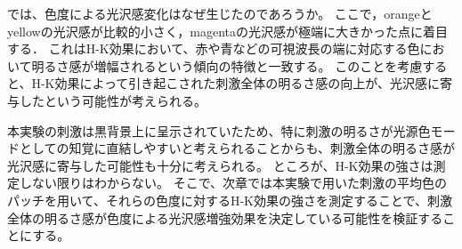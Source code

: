         では、色度による光沢感変化はなぜ生じたのであろうか。
        ここで，orangeとyellowの光沢感が比較的小さく，magentaの光沢感が極端に大きかった点に着目する．
        これはH-K効果において、赤や青などの可視波長の端に対応する色において明るさ感が増幅されるという傾向\cite{HKeffect}の特徴と一致する。
        このことを考慮すると、H-K効果によって引き起こされた刺激全体の明るさ感の向上が、光沢感に寄与したという可能性が考えられる。

        本実験の刺激は黒背景上に呈示されていたため、特に刺激の明るさが光源色モード\cite{LightMode}としての知覚に直結しやすいと考えられることからも、刺激全体の明るさ感が光沢感に寄与した可能性も十分に考えられる。
        ところが、H-K効果の強さは測定しない限りはわからない。
        そこで、次章では本実験で用いた刺激の平均色のパッチを用いて、それらの色度に対するH-K効果の強さを測定することで、刺激全体の明るさ感が色度による光沢感増強効果を決定している可能性を検証することにする。

    \newpage